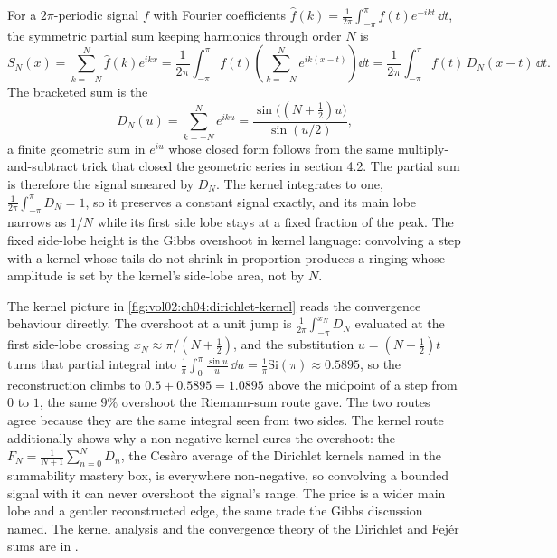 For a $2\pi$-periodic signal $f$ with Fourier coefficients $\hat{f}(k) =
\frac{1}{2\pi}\int_{-\pi}^{\pi} f(t) e^{-ikt}\,\dd t$, the symmetric
partial sum keeping harmonics through order $N$ is
\[
S_{N}(x) = \sum_{k=-N}^{N} \hat{f}(k) e^{ikx} = \frac{1}{2\pi}
\int_{-\pi}^{\pi} f(t) \left(\sum_{k=-N}^{N} e^{ik(x-t)}\right) \dd t
= \frac{1}{2\pi}\int_{-\pi}^{\pi} f(t)\, D_{N}(x - t)\,\dd t.
\]
The bracketed sum is the 
\[
D_{N}(u) = \sum_{k=-N}^{N} e^{iku} = \frac{\sin\bigl((N + \tfrac{1}{2})
u\bigr)}{\sin(u/2)},
\]
a finite geometric sum in $e^{iu}$ whose closed form follows from the
same multiply-and-subtract trick that closed the geometric series in
section 4.2. The partial sum is therefore the signal smeared by
$D_{N}$. The kernel integrates to one, $\frac{1}{2\pi}\int_{-\pi}^{\pi}
D_{N} = 1$, so it preserves a constant signal exactly, and its main lobe
narrows as $1/N$ while its first side lobe stays at a fixed fraction of
the peak. The fixed side-lobe height is the Gibbs overshoot in kernel
language: convolving a step with a kernel whose tails do not shrink in
proportion produces a ringing whose amplitude is set by the kernel's
side-lobe area, not by $N$.



The kernel picture in \autoref{fig:vol02:ch04:dirichlet-kernel} reads
the convergence behaviour directly. The overshoot at a unit jump is
$\frac{1}{2\pi}\int_{-\pi}^{x_{N}} D_{N}$ evaluated at the first
side-lobe crossing $x_{N} \approx \pi/(N + \tfrac{1}{2})$, and the
substitution $u = (N + \tfrac{1}{2})t$ turns that partial integral into
$\frac{1}{\pi}\int_{0}^{\pi}\frac{\sin u}{u}\,\dd u = \frac{1}{\pi}
\mathrm{Si}(\pi) \approx 0.5895$, so the reconstruction climbs to
$0.5 + 0.5895 = 1.0895$ above the midpoint of a step from $0$ to $1$,
the same $9\%$ overshoot the Riemann-sum route gave. The two routes
agree because they are the same integral seen from two sides. The kernel
route additionally shows why a non-negative kernel cures the overshoot:
the  $F_{N} = \frac{1}{N+1}\sum_{n=0}^{N}
D_{n}$, the Ces\`{a}ro average of the Dirichlet kernels named in the
summability mastery box, is everywhere non-negative, so convolving a
bounded signal with it can never overshoot the signal's range. The price
is a wider main lobe and a gentler reconstructed edge, the same trade the
Gibbs discussion named. The kernel analysis and the convergence theory
of the Dirichlet and Fej\'{e}r sums are in
\cite{text:v2ch03-stein-shakarchi-complex,text:v2ch06-hairer-wanner-analysis}.

